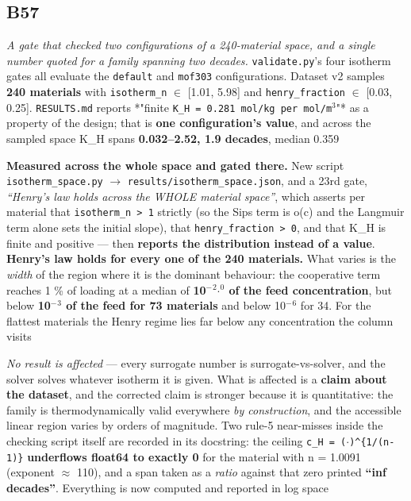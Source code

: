 \documentclass[10pt]{article}
\begin{document}
\subsection*{B57}\label{led:B57}
\begin{description}[leftmargin=0pt,itemsep=1pt]
\item[Defect.] \emph{A gate that checked two configurations of a 240-material space, and a single number quoted for a family spanning two decades.} \texttt{validate.py}'s four isotherm gates all evaluate the \texttt{default} and \texttt{mof303} configurations. Dataset v2 samples \textbf{240 materials} with \texttt{isotherm\_n} $\in$ [1.01, 5.98] and \texttt{henry\_fraction} $\in$ [0.03, 0.25]. \texttt{RESULTS.md} reports *"finite \texttt{K\_H = 0.281 mol/kg per mol/m$^3$}"* as a property of the design; that is \textbf{one configuration's value}, and across the sampled space K\_H spans \textbf{0.032--2.52, 1.9 decades}, median 0.359
\item[Resolution.] \textbf{Measured across the whole space and gated there.} New script \texttt{isotherm\_space.py} $\rightarrow$ \texttt{results/isotherm\_space.json}, and a 23rd gate, \emph{``Henry's law holds across the WHOLE material space''}, which asserts per material that \texttt{isotherm\_n > 1} strictly (so the Sips term is o(c) and the Langmuir term alone sets the initial slope), that \texttt{henry\_fraction > 0}, and that K\_H is finite and positive --- then \textbf{reports the distribution instead of a value}. \textbf{Henry's law holds for every one of the 240 materials.} What varies is the \emph{width} of the region where it is the dominant behaviour: the cooperative term reaches 1 \% of loading at a median of \textbf{10$^{-}$$^2$$\cdot$$^0$ of the feed concentration}, but below \textbf{10$^{-}$$^3$ of the feed for 73 materials} and below 10$^{-}$$^6$ for 34. For the flattest materials the Henry regime lies far below any concentration the column visits
\item[Note.] \emph{No result is affected} --- every surrogate number is surrogate-vs-solver, and the solver solves whatever isotherm it is given. What is affected is a \textbf{claim about the dataset}, and the corrected claim is stronger because it is quantitative: the family is thermodynamically valid everywhere \emph{by construction}, and the accessible linear region varies by orders of magnitude. Two rule-5 near-misses inside the checking script itself are recorded in its docstring: the ceiling \texttt{c\_H = ($\cdot$)\textasciicircum{}\{1/(n-1)\}} \textbf{underflows float64 to exactly 0} for the material with n = 1.0091 (exponent $\approx$ 110), and a span taken as a \emph{ratio} against that zero printed \textbf{``inf decades''}. Everything is now computed and reported in log space
\end{description}
\end{document}
